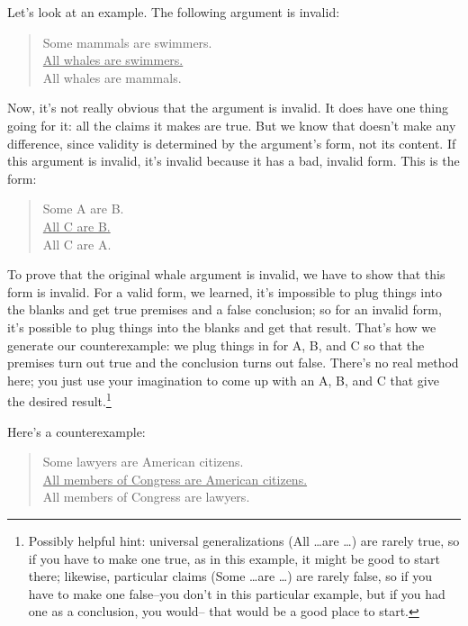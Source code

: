 Let's look at an example. The following argument is invalid:

\begin{quote}
Some mammals are swimmers. \\
\underline{All whales are swimmers.} \\
All whales are mammals. \\
\end{quote}

Now, it's not really obvious that the argument is invalid. It does have one thing going for it: all the
claims it makes are true. But we know that doesn't make any difference, since validity is
determined by the argument's form, not its content. If this argument is invalid, it's invalid because
it has a bad, invalid form. This is the form:

\begin{quote}
Some A are B. \\
\underline{All C are B.} \\
All C are A. \\
\end{quote}

To prove that the original whale argument is invalid, we have to show that this form is invalid. For
a valid form, we learned, it's impossible to plug things into the blanks and get true premises and a
false conclusion; so for an invalid form, it's possible to plug things into the blanks and get that
result. That's how we generate our counterexample: we plug things in for A, B, and C so that the
premises turn out true and the conclusion turns out false. There's no real method here; you just use
your imagination to come up with an A, B, and C that give the desired 
result.\footnote{Possibly helpful hint: universal generalizations (All \dots are \dots ) are rarely true, so if you have to make one true,
as in this example, it might be good to start there; likewise, particular claims (Some \dots are \dots ) are rarely false, so
if you have to make one false--you don't in this particular example, but if you had one as a conclusion, you would--
that would be a good place to start.}

Here's a
counterexample:

\begin{quote}
Some lawyers are American citizens. \\
\underline{All members of Congress are American citizens.} \\
All members of Congress are lawyers. \\
\end{quote}

